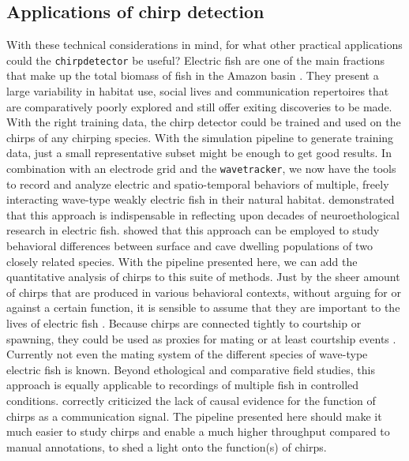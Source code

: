\subsection{Applications of chirp detection}

With these technical considerations in mind, for what other practical
applications could the \texttt{chirpdetector} be useful? Electric fish are one
of the main fractions that make up the total biomass of fish in the Amazon
basin \parencite{lassoCompositionAbundanceBiomass1992,
cramptonEcologicalPerspectiveDiversity2011a}. They present a large variability
in habitat use, social lives and communication repertoires that are
comparatively poorly explored and still offer exiting discoveries to be made.
With the right training data, the chirp detector could be trained and used on
the chirps of any chirping species. With the simulation pipeline to
generate training data, just a small representative subset might be enough to
get good results. In combination with an electrode grid and the
\texttt{wavetracker}, we now have the tools to record and analyze electric and
spatio-temporal behaviors of multiple, freely interacting wave-type weakly
electric fish in their natural habitat.
\textcite{henningerStatisticsNaturalCommunication2018} demonstrated that this
approach is indispensable in reflecting upon decades of neuroethological
research in electric fish. \textcite{fortuneSpookyInteractionDistance2020a}
showed that this approach can be employed to study behavioral differences
between surface and cave dwelling populations of two closely
related species. With the pipeline presented here, we can add the quantitative
analysis of chirps to this suite of methods. Just by the sheer amount of chirps
that are produced in various behavioral contexts, without arguing for or
against a certain function, it is sensible to assume that they are
important to the lives of electric fish
\parencite{henningerStatisticsNaturalCommunication2018, obotiWhyBrownGhost2023,
hupeElectrocommunicationSignalsFree2009}. Because chirps are connected
tightly to courtship or spawning, they could be used as proxies for mating or
at least courtship events
\parencite{henningerStatisticsNaturalCommunication2018,
hagedornCourtSparkElectric1985a}. Currently not even the mating system of the
different species of wave-type electric fish is known. Beyond ethological and
comparative field studies, this approach is equally applicable to recordings of
multiple fish in controlled conditions. \textcite{obotiWhyBrownGhost2023}
correctly criticized the lack of causal evidence for the function of chirps as
a communication signal. The pipeline presented here should make it much easier
to study chirps and enable a much higher throughput compared to manual
annotations, to shed a light onto the function(s) of chirps.

